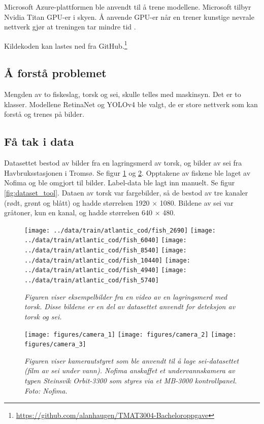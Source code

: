 Microsoft Azure-plattformen ble anvendt til å trene modellene. Microsoft tilbyr Nvidia Titan GPU-er i skyen. Å anvende GPU-er når en trener kunstige nevrale nettverk gjør at treningen tar mindre tid \cite{Dean m.fl. 2012 s. 1}.

Kildekoden kan lastes ned fra GitHub.\footnote{\url{https://github.com/alanhaugen/TMAT3004-Bacheloroppgave}}

\subsection{Å forstå problemet}

Mengden av to fiskeslag, torsk og sei, skulle telles med maskinsyn. Det er to klasser. Modellene RetinaNet og YOLOv4 ble valgt, de er store nettverk som kan forstå og trenes på bilder.

\subsection{Få tak i data}
\label{part:data}

Datasettet bestod av bilder fra en lagringsmerd av torsk, og bilder av sei fra Havbruksstasjonen i Tromsø. Se figur \ref{fig:data} og \ref{fig:nofima}. Opptakene av fiskene ble laget av Nofima og ble omgjort til bilder. Label-data ble lagt inn manuelt. Se figur \ref{fig:dataset_tool}. Dataen av torsk var fargebilder, så de bestod av tre kanaler (rødt, grønt og blått) og hadde størrelsen 1920 $\times$ 1080. Bildene av sei var gråtoner, kun en kanal, og hadde størrelsen 640 $\times$ 480. %

\begin{figure}[h!]
\begin{center} 
\texttt{[image: ../data/train/atlantic\_cod/fish\_2690]}
\texttt{[image: ../data/train/atlantic\_cod/fish\_6040]}
\texttt{[image: ../data/train/atlantic\_cod/fish\_8540]}
\texttt{[image: ../data/train/atlantic\_cod/fish\_10440]}
\texttt{[image: ../data/train/atlantic\_cod/fish\_4940]}
\texttt{[image: ../data/train/atlantic\_cod/fish\_5740]}
\caption{\small \sl Figuren viser eksempelbilder fra en video av en lagringsmerd med torsk. Disse bildene er en del av datasettet anvendt for deteksjon av torsk og sei. \cite{Nofima 2020} \label{fig:data}} 
\end{center} 
\end{figure} 

\begin{figure}[h!]
\begin{center} 
\texttt{[image: figures/camera\_1]}
\texttt{[image: figures/camera\_2]}
\texttt{[image: figures/camera\_3]}
\caption{\small \sl Figuren viser kamerautstyret som ble anvendt til å lage sei-datasettet (film av sei under vann). Nofima anskaffet et undervannskamera av typen Steinsvik Orbit-3300 som styres via et MB-3000 kontrollpanel. Foto: Nofima. \cite{Lindberg og Evensen 2020} \label{fig:nofima}} 
\end{center} 
\end{figure} 

